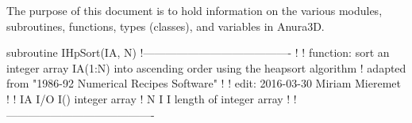 
The purpose of this document is to hold information on the various modules, subroutines, functions, types (classes), and variables in Anura3D.

\begin{fortran_subroutine_lst}[MySubroutine]
    subroutine IHpSort(IA, N)
      !----------------------------------------
      !
      !  function: sort an integer array IA(1:N) into ascending order using the heapsort algorithm
      !            adapted from "1986-92 Numerical Recipes Software"
      !
      !  edit: 2016-03-30 Miriam Mieremet 
      !
      !  IA   I/O   I()   integer array
      !  N    I     I     length of integer array
      !
      !----------------------------------------
\end{fortran_subroutine_lst}
